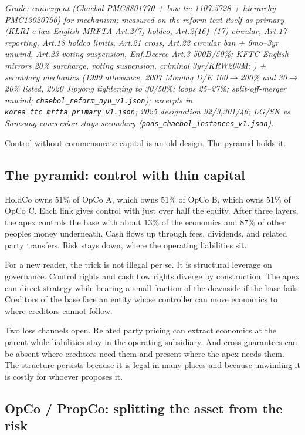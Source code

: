 \documentclass[11pt]{article}
\begin{document}
\textit{Grade: convergent (Chaebol PMC8801770 + bow tie 1107.5728 + hierarchy PMC13020756) for mechanism; measured on the reform text itself as primary (KLRI e-law English MRFTA Art.2(7) holdco, Art.2(16)--(17) circular, Art.17 reporting, Art.18 holdco limits, Art.21 cross, Art.22 circular ban + 6mo--3yr unwind, Art.23 voting suspension, Enf.Decree Art.3 500B/50\%; KFTC English mirrors 20\% surcharge, voting suspension, criminal 3yr/KRW200M; \citep{klri2022mrfta,kftc2024large}) + secondary mechanics (1999 allowance, 2007 Mondaq D/E 100$\to$200\% and 30$\to$20\% listed, 2020 Jipyong tightening to 30/50\%; loops 25--27\%; split-off-merger unwind; \texttt{chaebol\_reform\_nyu\_v1.json}); excerpts in \texttt{korea\_ftc\_mrfta\_primary\_v1.json}; 2025 designation 92/3,301/46; LG/SK vs Samsung conversion stays secondary (\texttt{pods\_chaebol\_instances\_v1.json}).}

Control without commensurate capital is an old design. The pyramid holds it.

\subsection{The pyramid: control with thin capital}

HoldCo owns $51\%$ of OpCo A, which owns $51\%$ of OpCo B, which owns $51\%$ of OpCo C. Each link gives control with just over half the equity. After three layers, the apex controls the base with about $13\%$ of the economics and $87\%$ of other peoples money underneath. Cash flows up through fees, dividends, and related party transfers. Risk stays down, where the operating liabilities sit.

For a new reader, the trick is not illegal per se. It is structural leverage on governance. Control rights and cash flow rights diverge by construction. The apex can direct strategy while bearing a small fraction of the downside if the base fails. Creditors of the base face an entity whose controller can move economics to where creditors cannot follow.

Two loss channels open. Related party pricing can extract economics at the parent while liabilities stay in the operating subsidiary. And cross guarantees can be absent where creditors need them and present where the apex needs them. The structure persists because it is legal in many places and because unwinding it is costly for whoever proposes it.

\subsection{OpCo / PropCo: splitting the asset from the risk}
\end{document}
